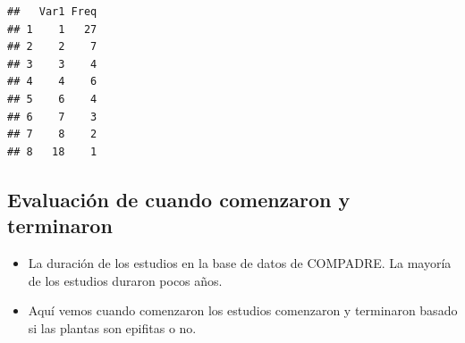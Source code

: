 \documentclass[
]{book}
\providecommand{\tightlist}{%
  \setlength{\itemsep}{0pt}\setlength{\parskip}{0pt}}
\theoremstyle{definition}
\theoremstyle{definition}
\theoremstyle{definition}
\theoremstyle{definition}
\theoremstyle{remark}
\begin{document}
\begin{verbatim}
##   Var1 Freq
## 1    1   27
## 2    2    7
## 3    3    4
## 4    4    6
## 5    6    4
## 6    7    3
## 7    8    2
## 8   18    1
\end{verbatim}

\subsection{Evaluación de cuando comenzaron y terminaron}\label{evaluaciuxf3n-de-cuando-comenzaron-y-terminaron}

\begin{itemize}
\tightlist
\item
  La duración de los estudios en la base de datos de COMPADRE. La mayoría de los estudios duraron pocos años.
\item
  Aquí vemos cuando comenzaron los estudios comenzaron y terminaron basado si las plantas son epifitas o no.
\end{itemize}
\end{document}
